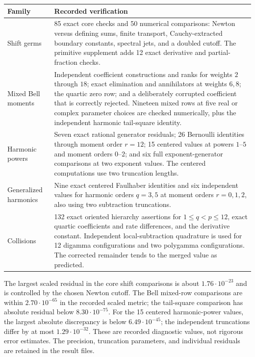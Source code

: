 \documentclass[11pt,a4paper]{article}
\numberwithin{equation}{section}
\theoremstyle{definition}
\theoremstyle{remark}
\begin{document}
\begin{longtable}{@{}p{}p{}@{}}
\toprule
Family & Recorded verification\\
\midrule
\endhead
Shift germs & 85 exact core checks and 50 numerical comparisons:
Newton versus defining sums, finite transport, Cauchy-extracted
boundary constants, spectral jets, and a doubled cutoff.
The primitive supplement adds 12 exact derivative and partial-fraction
checks.\\[5pt]
Mixed Bell moments & Independent coefficient constructions and ranks
for weights $2$ through $18$; exact elimination and annihilators at
weights $6,8$; the quartic zero row; and a deliberately corrupted
coefficient that is correctly rejected. Nineteen mixed rows at five
real or complex parameter choices are checked numerically, plus the
independent harmonic tail-square identity.\\[5pt]
Harmonic powers & Seven exact rational generator residuals;
26 Bernoulli identities through moment order $r=12$;
15 centered values at powers $1$--$5$ and moment orders $0$--$2$;
and six full exponent-generator comparisons at two exponent values.
The centered computations use two truncation lengths.\\[5pt]
Generalized harmonics & Nine exact centered Faulhaber identities and
six independent values for harmonic orders $q=3,5$ at moment orders
$r=0,1,2$, also using two subtraction truncations.\\[5pt]
Collisions & 132 exact oriented hierarchy assertions for
$1\le q<p\le12$, exact quartic coefficients and rate differences,
and the derivative constant. Independent local-subtraction quadrature
is used for 12 digamma configurations and two polygamma configurations.
The corrected remainder tends to the merged value as predicted.\\
\bottomrule
\end{longtable}

The largest scaled residual in the core shift comparisons is about
$1.76\cdot10^{-23}$ and is controlled by the chosen Newton cutoff.
The Bell mixed-row comparisons are within
$2.70\cdot10^{-65}$ in the recorded scaled metric; the tail-square
comparison has absolute residual below $8.30\cdot10^{-75}$.
For the 15 centered harmonic-power values, the largest absolute
discrepancy is below $6.49\cdot10^{-45}$; the independent truncations
differ by at most $1.29\cdot10^{-32}$. These are recorded diagnostic
values, not rigorous error estimates. The precision, truncation
parameters, and individual residuals are retained in the result files.
\end{document}
